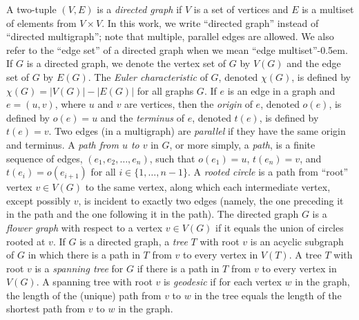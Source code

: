 \documentclass{elsarticlenonatbib}
\begin{document}
A two-tuple $(V, E)$ is a \emph{directed graph} if $V$ is a set of vertices and $E$ is a multiset of elements from $V \times V$.
In this work, we write ``directed graph'' instead of ``directed multigraph''; note that multiple, parallel edges are allowed.
We also refer to the ``edge set'' of a directed graph when we mean ``edge multiset''\kern-0.5em.
If $G$ is a directed graph, we denote the vertex set of $G$ by $V(G)$ and the edge set of $G$ by $E(G)$.
The \emph{Euler characteristic} of $G$, denoted $\chi(G)$, is defined by $\chi(G) = |V(G)| - |E(G)|$ for all graphs $G$.
If $e$ is an edge in a graph and $e = (u, v)$, where $u$ and $v$ are vertices, then the \emph{origin} of $e$, denoted $o(e)$, is defined by $o(e) = u$ and the \emph{terminus} of $e$, denoted $t(e)$, is defined by $t(e) = v$.
Two edges (in a multigraph) are \emph{parallel} if they have the same origin and terminus.
A \emph{path from $u$ to $v$} in $G$, or more simply, a \emph{path}, is a finite sequence of edges, $(e_1, e_2, \dotsc, e_n)$, such that $o(e_1) = u$, $t(e_n) = v$, and $t(e_i) = o(e_{i + 1})$ for all $i \in \{1, \dotsc, n - 1\}$.
A \emph{rooted circle} is a path from ``root'' vertex $v \in V(G)$ to the same vertex, along which each intermediate vertex, except possibly $v$, is incident to exactly two edges (namely, the one preceding it in the path and the one following it in the path).
The directed graph $G$ is a \emph{flower graph} with respect to a vertex $v \in V(G)$ if it equals the union of circles rooted at $v$.
If $G$ is a directed graph, a \emph{tree} $T$ with root $v$ is an acyclic subgraph of $G$ in which there is a path in $T$ from $v$ to every vertex in $V(T)$.
A tree $T$ with root $v$ is a \emph{spanning tree} for $G$ if there is a path in $T$ from $v$ to every vertex in $V(G)$.
A spanning tree with root $v$ is \emph{geodesic} if for each vertex $w$ in the graph, the length of the (unique) path from $v$ to $w$ in the tree equals the length of the shortest path from $v$ to $w$ in the graph.
\end{document}
